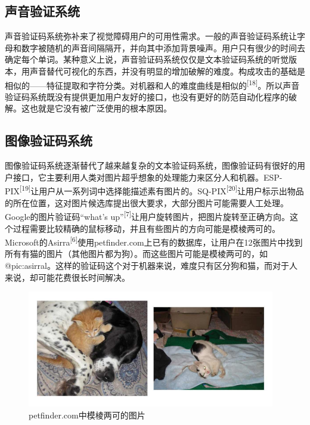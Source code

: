 \documentclass[bachelor,zhspacing]{cqu}  %
\begin{document}
\subsection{声音验证系统}\label{ux58f0ux97f3ux9a8cux8bc1ux7cfbux7edf}

声音验证码系统弥补来了视觉障碍用户的可用性需求。一般的声音验证码系统让字母和数字被随机的声音间隔隔开，并向其中添加背景噪声。用户只有很少的时间去确定每个单词。某种意义上说，声音验证码系统仅仅是文本验证码系统的听觉版本，用声音替代可视化的东西，并没有明显的增加破解的难度。构成攻击的基础是相似的------特征提取和字符分类。对机器和人的难度曲线是相似的\textsuperscript{{[}18{]}}。所以声音验证码系统既没有提供更加用户友好的接口，也没有更好的防范自动化程序的破解。这也就是它没有被广泛使用的根本原因。

\subsection{图像验证码系统}\label{ux56feux50cfux9a8cux8bc1ux7801ux7cfbux7edf}

图像验证码系统逐渐替代了越来越复杂的文本验证码系统，图像验证码有很好的用户接口，它主要利用人类对图片超乎想象的处理能力来区分人和机器。ESP-PIX\textsuperscript{{[}19{]}}让用户从一系列词中选择能描述素有图片的。SQ-PIX\textsuperscript{{[}20{]}}让用户标示出物品的所在位置，这对图片候选库提出很大要求，大部分图片可能需要人工处理。Google的图片验证码``what's
up''\textsuperscript{{[}7{]}}让用户旋转图片，把图片旋转至正确方向。这个过程需要比较精确的鼠标移动，并且有些图片的方向可能是模棱两可的。Microsoft的Asirra\textsuperscript{{[}6{]}}使用petfinder.com上已有的数据库，让用户在12张图片中找到所有有猫的图片（其他图片都为狗）。而这些图片可能是模棱两可的，如@pic:asirral。这样的验证码这个对于机器来说，难度只有区分狗和猫，而对于人来说，却可能花费很长时间解决。

\begin{figure}[htbp]
\centering
\includegraphics{pic/asirral.png}
\caption{petfinder.com中模棱两可的图片}\label{pic:asirral}
\end{figure}
\end{document}
